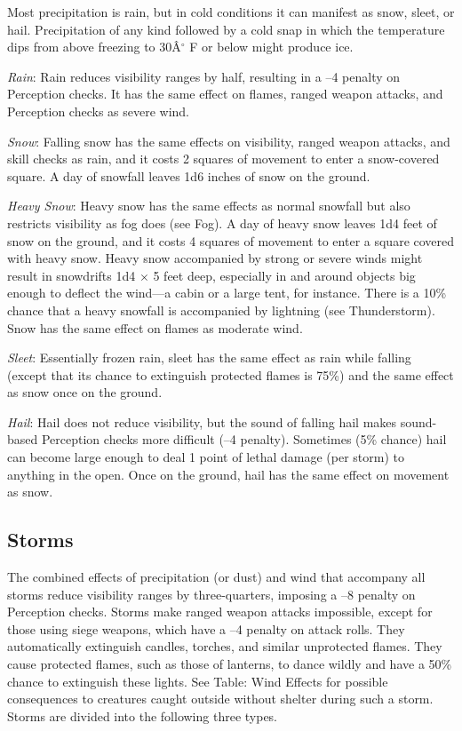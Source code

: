 Most precipitation is rain, but in cold conditions it can manifest as snow, sleet, or hail. Precipitation of any kind followed by a cold snap in which the temperature dips from above freezing to 30\^A\mbox{${}^\circ$} F or below might produce ice. 
				
\textit{Rain}: Rain reduces visibility ranges by half, resulting in a --4 penalty on Perception checks. It has the same effect on flames, ranged weapon attacks, and Perception checks as severe wind.
				
\textit{Snow}: Falling snow has the same effects on visibility, ranged weapon attacks, and skill checks as rain, and it costs 2 squares of movement to enter a snow-covered square. A day of snowfall leaves 1d6 inches of snow on the ground.
				
\textit{Heavy Snow}: Heavy snow has the same effects as normal snowfall but also restricts visibility as fog does (see Fog). A day of heavy snow leaves 1d4 feet of snow on the ground, and it costs 4 squares of movement to enter a square covered with heavy snow. Heavy snow accompanied by strong or severe winds might result in snowdrifts 1d4 \mbox{$\times$} 5 feet deep, especially in and around objects big enough to deflect the wind---a cabin or a large tent, for instance. There is a 10\% chance that a heavy snowfall is accompanied by lightning (see Thunderstorm). Snow has the same effect on flames as moderate wind.
				
\textit{Sleet}: Essentially frozen rain, sleet has the same effect as rain while falling (except that its chance to extinguish protected flames is 75\%) and the same effect as snow once on the ground. 
				
\textit{Hail}: Hail does not reduce visibility, but the sound of falling hail makes sound-based Perception checks more difficult (--4 penalty). Sometimes (5\% chance) hail can become large enough to deal 1 point of lethal damage (per storm) to anything in the open. Once on the ground, hail has the same effect on movement as snow.
				
\subsection{Storms}

				
The combined effects of precipitation (or dust) and wind that accompany all storms reduce visibility ranges by three-quarters, imposing a --8 penalty on Perception checks. Storms make ranged weapon attacks impossible, except for those using siege weapons, which have a --4 penalty on attack rolls. They automatically extinguish candles, torches, and similar unprotected flames. They cause protected flames, such as those of lanterns, to dance wildly and have a 50\% chance to extinguish these lights. See Table: Wind Effects for possible consequences to creatures caught outside without shelter during such a storm. Storms are divided into the following three types. 
				

